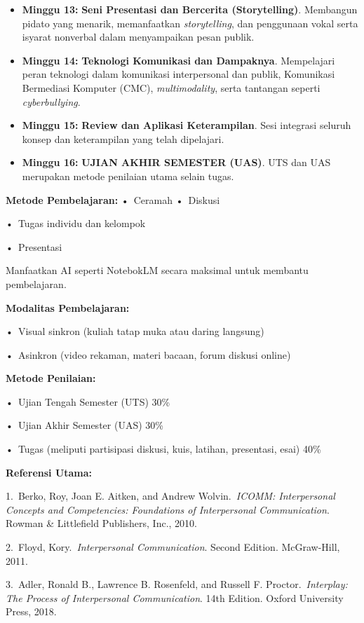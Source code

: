 \documentclass[
  letterpaper,
  DIV=11,
  numbers=noendperiod]{scrreprt}
\begin{document}
\begin{itemize}
  sejarah bidang komunikasi publik, mengembangkan keberanian dan rasa
  percaya diri, dan struktur pidato dasar.
\item
  \textbf{Minggu 13:} \textbf{Seni Presentasi dan Bercerita
  (Storytelling)}. Membangun pidato yang menarik, memanfaatkan
  \emph{storytelling}, dan penggunaan vokal serta isyarat nonverbal
  dalam menyampaikan pesan publik.
\item
  \textbf{Minggu 14:} \textbf{Teknologi Komunikasi dan Dampaknya}.
  Mempelajari peran teknologi dalam komunikasi interpersonal dan publik,
  Komunikasi Bermediasi Komputer (CMC), \emph{multimodality}, serta
  tantangan seperti \emph{cyberbullying}.
\item
  \textbf{Minggu 15:} \textbf{Review dan Aplikasi Keterampilan}. Sesi
  integrasi seluruh konsep dan keterampilan yang telah dipelajari.
\item
  \textbf{Minggu 16:} \textbf{UJIAN AKHIR SEMESTER (UAS)}. UTS dan UAS
  merupakan metode penilaian utama selain tugas.
\end{itemize}

\textbf{Metode Pembelajaran:} •~Ceramah •~Diskusi

•~Tugas individu dan kelompok

•~Presentasi

Manfaatkan AI seperti NotebokLM secara maksimal untuk membantu
pembelajaran.

\textbf{Modalitas Pembelajaran:}

•~Visual sinkron (kuliah tatap muka atau daring langsung)

•~Asinkron (video rekaman, materi bacaan, forum diskusi online)

\textbf{Metode Penilaian:}

•~Ujian Tengah Semester (UTS) 30\%

•~Ujian Akhir Semester (UAS) 30\%

•~Tugas (meliputi partisipasi diskusi, kuis, latihan, presentasi, esai)
40\%

\textbf{Referensi Utama:}

1.~Berko, Roy, Joan E. Aitken, and Andrew Wolvin.~\emph{ICOMM:
Interpersonal Concepts and Competencies: Foundations of Interpersonal
Communication}. Rowman \& Littlefield Publishers, Inc., 2010.

2.~Floyd, Kory.~\emph{Interpersonal Communication}. Second Edition.
McGraw-Hill, 2011.

3.~Adler, Ronald B., Lawrence B. Rosenfeld, and Russell F.
Proctor.~\emph{Interplay: The Process of Interpersonal Communication}.
14th Edition. Oxford University Press, 2018.
\end{document}
